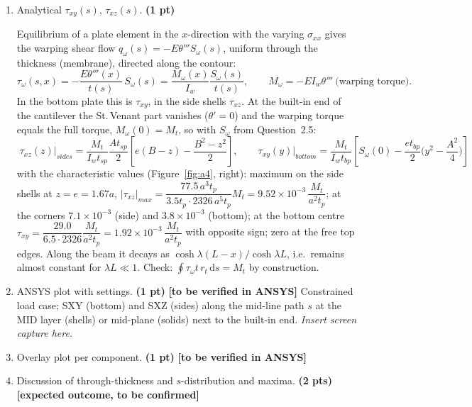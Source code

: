 \begin{enumerate}[label=\roman*.]
  \item Analytical $\tau_{xy}(s)$, $\tau_{xz}(s)$. \textbf{(1 pt)}

  Equilibrium of a plate element in the $x$-direction with the varying $\sigma_{xx}$ gives the warping shear flow $q_\omega(s)=-E\theta'''S_\omega(s)$, uniform through the thickness (membrane), directed along the contour:
  \begin{equation}
    \tau_\omega(s,x)=-\frac{E\theta'''(x)}{t(s)}\,S_\omega(s)=\frac{M_\omega(x)}{I_w}\frac{S_\omega(s)}{t(s)},\qquad M_\omega=-EI_w\theta'''\ \text{(warping torque)} .
  \end{equation}
  In the bottom plate this is $\tau_{xy}$, in the side shells $\tau_{xz}$. At the built-in end of the cantilever the St.\,Venant part vanishes ($\theta'=0$) and the warping torque equals the full torque, $M_\omega(0)=M_t$, so with $S_\omega$ from Question~2.5:
  \begin{equation}
    \boxed{\;\tau_{xz}(z)\big|_{sides}=\frac{M_t}{I_wt_{sp}}\frac{At_{sp}}{2}\left[e(B-z)-\frac{B^2-z^2}{2}\right],\qquad
    \tau_{xy}(y)\big|_{bottom}=\frac{M_t}{I_wt_{bp}}\left[S_\omega(0)-\frac{et_{bp}}{2}\Big(y^2-\frac{A^2}{4}\Big)\right]\;}
  \end{equation}
  with the characteristic values (Figure~\ref{fig:a4}, right): maximum on the side shells at $z=e=1.67a$, $|\tau_{xz}|_{max}=\dfrac{77.5\,a^3t_p}{3.5t_p\cdot2326\,a^5t_p}M_t=9.52\times10^{-3}\,\dfrac{M_t}{a^2t_p}$; at the corners $7.1\times10^{-3}$ (side) and $3.8\times10^{-3}$ (bottom); at the bottom centre $\tau_{xy}=\dfrac{29.0}{6.5\cdot2326}\dfrac{M_t}{a^2t_p}=1.92\times10^{-3}\,\dfrac{M_t}{a^2t_p}$ with opposite sign; zero at the free top edges. Along the beam it decays as $\cosh\lambda(L-x)/\cosh\lambda L$, i.e.\ remains almost constant for $\lambda L\ll1$. Check: $\oint\tau_\omega t\,r_t\,\mathrm{d}s=M_t$ by construction.

  \item ANSYS plot with settings. \textbf{(1 pt)} \textbf{[to be verified in ANSYS]} Constrained load case; SXY (bottom) and SXZ (sides) along the mid-line path $s$ at the MID layer (shells) or mid-plane (solids) next to the built-in end. \emph{Insert screen capture here.}

  \item Overlay plot per component. \textbf{(1 pt)} \textbf{[to be verified in ANSYS]}

  \item Discussion of through-thickness and $s$-distribution and maxima. \textbf{(2 pts)} \textbf{[expected outcome, to be confirmed]}


\end{enumerate}
